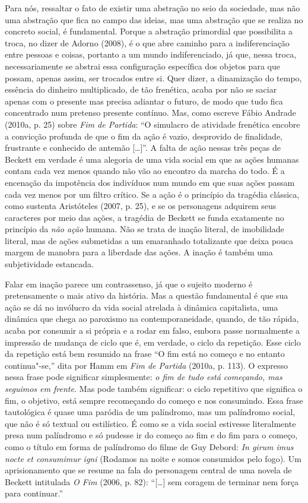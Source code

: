 {Para nós, ressaltar o fato de existir uma abstração no seio da
sociedade, mas não uma abstração que fica no campo das ideias, mas uma
abstração que se realiza no concreto social, é fundamental. Porque a
abstração primordial que possibilita a troca, no dizer de Adorno (2008),
é o que abre caminho para a indiferenciação entre pessoas e coisas,
portanto a um mundo indiferenciado, já que, nessa troca, necessariamente
se abstrai essa configuração específica dos objetos para que possam,
apenas assim, ser trocados entre si. Quer dizer, a dinamização do tempo,
essência do dinheiro multiplicado, de tão frenética, acaba por não se
saciar apenas com o presente mas precisa adiantar o futuro, de modo que
tudo fica concentrado num pretenso presente contínuo. Mas, como escreve
Fábio Andrade (2010a, p. 25) sobre \emph{Fim de Partida}: ``O simulacro
de atividade frenética encobre a convicção profunda de que o fim da ação
é vazio, desprovido de finalidade, frustrante e conhecido de antemão
[\ldots{}]''. A falta de ação nessas três peças de Beckett em verdade é
uma alegoria de uma vida social em que as ações humanas contam cada vez
menos quando não vão ao encontro da marcha do todo. É a encenação da
impotência dos indivíduos num mundo em que suas ações passam cada vez
menos por um filtro crítico. Se a ação é o princípio da tragédia
clássica, como sustenta Aristóteles (2007, p. 25), e se os personagens
adquirem seus caracteres por meio das ações, a tragédia de Beckett se
funda exatamente no princípio da \emph{não ação} humana. Não se trata de
inação literal, de imobilidade literal, mas de ações submetidas a um
emaranhado totalizante que deixa pouca margem de manobra para a
liberdade das ações. A inação é também uma subjetividade estancada.

Falar em inação parece um contrassenso, já que o sujeito moderno é
pretensamente o mais ativo da história. Mas a questão fundamental é que
sua ação se dá no invólucro da vida social atrelada à dinâmica
capitalista, uma dinâmica que chega ao paroxismo na contemporaneidade,
quando, de tão rápida, acaba por consumir a si própria e a rodar em
falso, embora passe normalmente a impressão de mudança de ciclo que é,
em verdade, o ciclo da repetição. Esse ciclo da repetição está bem
resumido na frase ``O fim está no começo e no entanto continua"-se,''
dita por Hamm em \emph{Fim de Partida} (2010a, p. 113). O
expresso nessa frase pode significar simplesmente: \emph{o fim de tudo
está começando, mas seguimos em frente.} Mas pode também significar: o
ciclo repetitivo que significa o fim, o objetivo, está sempre
recomeçando do começo e nos consumindo. Essa frase tautológica é quase
uma paródia de um palíndromo, mas um palíndromo social, que não é só
textual ou estilístico. É como se a vida social estivesse literalmente
presa num palíndromo e só pudesse ir do começo ao fim e do fim para o
começo, como o título em forma de palíndromo do filme de Guy Debord:
\emph{In girum imus nocte et consumimur igni} (Rodamos na noite e somos
consumidos pelo fogo). Um aprisionamento que se resume na fala do
personagem central de uma novela de Beckett intitulada \emph{O Fim}
(2006, p. 82): ``[\ldots{}] sem coragem de terminar nem força para
continuar.''

}

